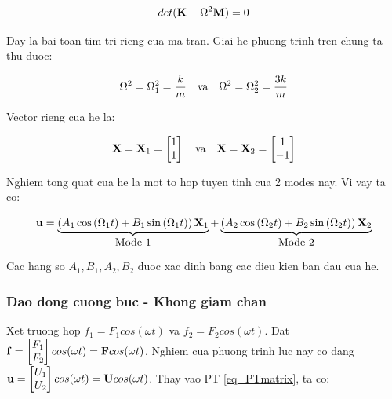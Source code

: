 \begin{equation}
    det({\bf K}-\Omega^2{\bf M}) = 0
\end{equation}

Day la bai toan tim tri rieng cua ma tran. Giai he phuong trinh tren chung ta thu duoc:

\begin{equation}
    \Omega^2 =  \Omega_1^2 = \frac{k}{m} \quad \hbox{va} \quad \Omega^2 = \Omega_2^2 = \frac{3k}{m}
\end{equation}

Vector rieng cua he la:

\begin{equation}
    {\bf X} = {\bf X}_1 = \begin{bmatrix}
        1 \\ 1
    \end{bmatrix} \quad \hbox{va} \quad {\bf X} = {\bf X}_2 = \begin{bmatrix}
        1 \\ -1
    \end{bmatrix}
\end{equation}

Nghiem tong quat cua he la mot to hop tuyen tinh cua 2 modes nay. Vi vay ta co:

\begin{equation}
    {\bf u}=\underbrace{\left(A_1 \cos \left(\Omega_1 t\right)+B_1 \sin \left(\Omega_1 t\right)\right) {\bf X}_1}_{\hbox{Mode 1}}+\underbrace{\left(A_2 \cos \left(\Omega_2 t\right)+B_2 \sin \left(\Omega_2 t\right)\right) {\bf X}_2}_{\hbox{Mode 2}}
\end{equation}

Cac hang so $A_1, B_1, A_2, B_2$ duoc xac dinh bang cac dieu kien ban dau cua he.

\subsubsection{Dao dong cuong buc - Khong giam chan}

Xet truong hop $f_1 = F_1cos(\omega t)$ va $f_2 = F_2cos(\omega t)$. Dat ${\bf f} = \begin{bmatrix} F_1 \\ F_2\end{bmatrix}cos(\omega t) = {\bf F}cos(\omega t)$. Nghiem cua phuong trinh luc nay co dang ${\bf u} = \begin{bmatrix} U_1 \\ U_2\end{bmatrix}cos(\omega t) = {\bf U}cos(\omega t)$. Thay vao PT \cref{eq_PTmatrix}, ta co:

